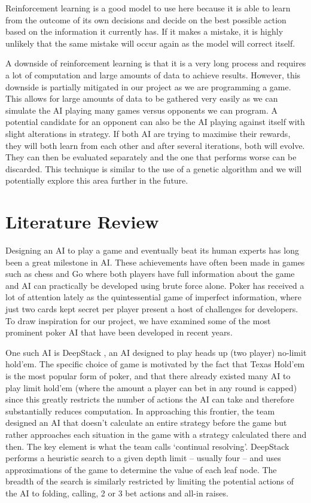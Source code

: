 \documentclass{article}
\begin{document}
\begin{multicols*}{2}
Reinforcement learning is a good model to use here because it is able to learn from the outcome of its own decisions and decide on the best possible action based on the information it currently has. If it makes a mistake, it is highly unlikely that the same mistake will occur again as the model will correct itself.
\newline

A downside of reinforcement learning is that it is a very long process and requires a lot of computation and large amounts of data to achieve results. However, this downside is partially mitigated in our project as we are programming a game. This allows for large amounts of data to be gathered very easily as we can simulate the AI playing many games versus opponents we can program. A potential candidate for an opponent can also be the AI playing against itself with slight alterations in strategy. If both AI are trying to maximise their rewards, they will both learn from each other and after several iterations, both will evolve. They can then be evaluated separately and the one that performs worse can be discarded. This technique is similar to the use of a genetic algorithm and we will potentially explore this area further in the future.


\section{Literature Review}

Designing an AI to play a game and eventually beat its human experts has long been a great milestone in AI. These achievements have often been made in games such as chess and Go where both players have full information about the game and AI can practically be developed using brute force alone. Poker has received a lot of attention lately as the quintessential game of imperfect information, where just two cards kept secret per player present a host of challenges for developers. To draw inspiration for our project, we have examined some of the most prominent poker AI that have been developed in recent years.
\newline

One such AI is DeepStack \cite{Deepstack}, an AI designed to play heads up (two player) no-limit hold’em. The specific choice of game is motivated by the fact that Texas Hold’em is the most popular form of poker, and that there already existed many AI to play limit hold’em (where the amount a player can bet in any round is capped) since this greatly restricts the number of actions the AI can take and therefore substantially reduces computation. In approaching this frontier, the team designed an AI that doesn’t calculate an entire strategy before the game but rather approaches each situation in the game with a strategy calculated there and then. The key element is what the team calls ‘continual resolving’. DeepStack performs a heuristic search to a given depth limit – usually four – and uses approximations of the game to determine the value of each leaf node. The breadth of the search is similarly restricted by limiting the potential actions of the AI to folding, calling, 2 or 3 bet actions and all-in raises.
\newline


\end{multicols*}
\end{document}
